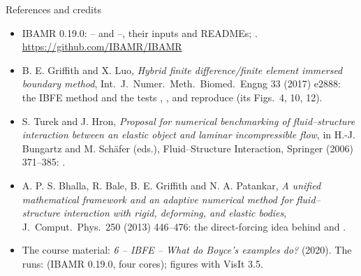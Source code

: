 \documentclass[aspectratio=169,11pt]{beamer}
\begin{document}
\begin{frame}{References and credits}
\label{fr:refs}
\scriptsize
\begin{itemize}
  \item IBAMR 0.19.0: -- and --, their inputs and READMEs; . \url{https://github.com/IBAMR/IBAMR}
  \item B. E. Griffith and X. Luo, \emph{Hybrid finite difference/finite element immersed boundary method}, Int.\ J.\ Numer.\ Meth.\ Biomed.\ Engng 33 (2017) e2888: the IBFE method and the tests , ,  and  reproduce (its Figs.\ 4, 10, 12).
  \item S. Turek and J. Hron, \emph{Proposal for numerical benchmarking of fluid--structure interaction between an elastic object and laminar incompressible flow}, in H.-J. Bungartz and M. Sch\"afer (eds.), Fluid--Structure Interaction, Springer (2006) 371--385: .
  \item A. P. S. Bhalla, R. Bale, B. E. Griffith and N. A. Patankar, \emph{A unified mathematical framework and an adaptive numerical method for fluid--structure interaction with rigid, deforming, and elastic bodies}, J.\ Comput.\ Phys.\ 250 (2013) 446--476: the direct-forcing idea behind  and .
  \item The course material: \emph{6 -- IBFE -- What do Boyce's examples do?} (2020). The runs:  (IBAMR 0.19.0, four cores); figures with VisIt 3.5.
\end{itemize}
\end{frame}
\end{document}
